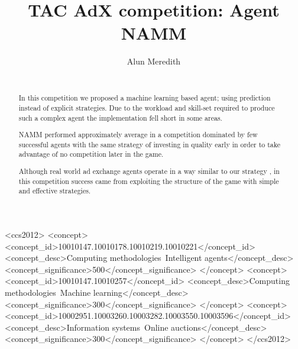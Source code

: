 \documentclass{sig-alternate-05-2015}
\begin{document}
\title{TAC AdX competition: Agent NAMM}
\author{
\alignauthor
Alun Meredith\\
       \\
}
\maketitle
\begin{abstract}
In this competition we proposed a machine learning based agent; using prediction instead of explicit strategies. Due to the workload and skill-set required to produce such a complex agent the implementation fell short in some areas.

NAMM performed approximately average in a competition dominated by few successful agents with the same strategy of investing in quality early in order to take advantage of no competition later in the game.

Although real world ad exchange agents operate in a way similar to our strategy \cite{edelman2005internet}, in this competition success came from exploiting the structure of the game with simple and effective strategies. 
\end{abstract}


%
%
\begin{CCSXML}
<ccs2012>
<concept>
<concept_id>10010147.10010178.10010219.10010221</concept_id>
<concept_desc>Computing methodologies~Intelligent agents</concept_desc>
<concept_significance>500</concept_significance>
</concept>
<concept>
<concept_id>10010147.10010257</concept_id>
<concept_desc>Computing methodologies~Machine learning</concept_desc>
<concept_significance>300</concept_significance>
</concept>
<concept>
<concept_id>10002951.10003260.10003282.10003550.10003596</concept_id>
<concept_desc>Information systems~Online auctions</concept_desc>
<concept_significance>300</concept_significance>
</concept>
</ccs2012>
\end{CCSXML}




%
%

%
%
\printccsdesc
\end{document}
